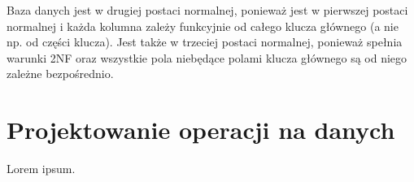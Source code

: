 Baza danych jest w drugiej postaci normalnej, ponieważ jest w pierwszej postaci normalnej i każda kolumna zależy funkcyjnie od całego klucza głównego (a nie np. od części klucza). Jest także w trzeciej postaci normalnej, ponieważ spełnia warunki 2NF oraz wszystkie pola niebędące polami klucza głównego są od niego zależne bezpośrednio.


\section{Projektowanie operacji na danych}
\label{sec:operacje}

Lorem ipsum.
